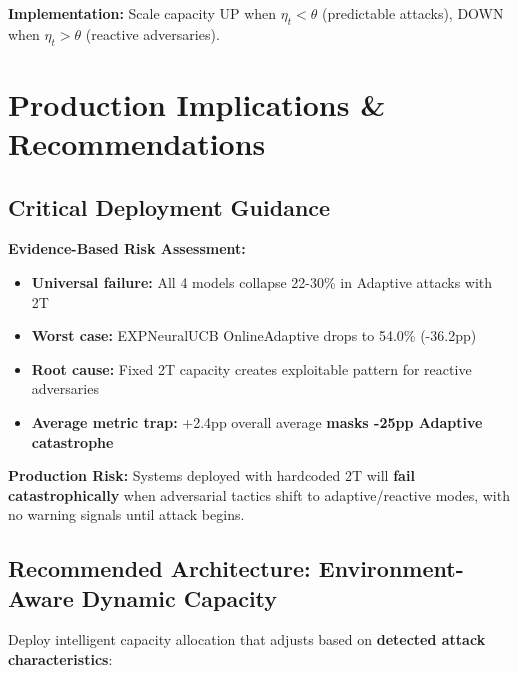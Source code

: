 \documentclass[11pt,a4paper]{article}
\newcommand{\critical}[1]{\textcolor{criticalcolor}{\textbf{#1}}}
\begin{document}
\textbf{Implementation:} Scale capacity UP when $\eta_t < \theta$ (predictable attacks), DOWN when $\eta_t > \theta$ (reactive adversaries).

\section{Production Implications \& Recommendations}

\subsection{Critical Deployment Guidance}

\begin{tcolorbox}[colback=criticalcolor!10,colframe=criticalcolor,title=⚠️ CRITICAL: Do Not Deploy Fixed 2T in Adversarial Environments]
\scriptsize
\textbf{Evidence-Based Risk Assessment:}
\begin{itemize}
\item \textbf{Universal failure:} All 4 models collapse 22-30\% in Adaptive attacks with 2T
\item \textbf{Worst case:} EXPNeuralUCB OnlineAdaptive drops to 54.0\% (-36.2pp)
\item \textbf{Root cause:} Fixed 2T capacity creates exploitable pattern for reactive adversaries
\item \textbf{Average metric trap:} +2.4pp overall average \critical{masks -25pp Adaptive catastrophe}
\end{itemize}

\textbf{Production Risk:} Systems deployed with hardcoded 2T will \critical{fail catastrophically} when adversarial tactics shift to adaptive/reactive modes, with no warning signals until attack begins.
\end{tcolorbox}

\subsection{Recommended Architecture: Environment-Aware Dynamic Capacity}

Deploy intelligent capacity allocation that adjusts based on \textbf{detected attack characteristics}:

\vspace{-0.4cm}
\end{document}
